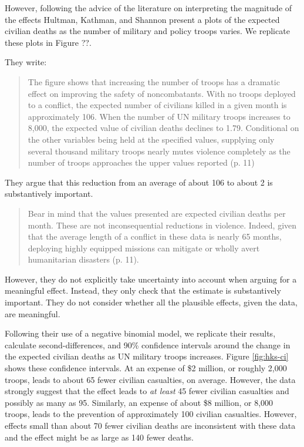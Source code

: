\documentclass[12pt]{article}
\begin{document}
However, following the advice of the literature on interpreting the magnitude of the effects Hultman, Kathman, and Shannon present a plots of the expected civilian deaths as the number of military and policy troops varies. We replicate these plots in Figure ??.

They write:

\begin{quote}
The figure shows that increasing the number of troops has a dramatic effect on improving the safety of noncombatants. With no troops deployed to a conflict, the expected number of civilians killed in a given month is approximately 106. When the number of UN military troops increases to 8,000, the expected value of civilian deaths declines to 1.79. Conditional on the other variables being held at the specified values, supplying only several thousand military troops nearly mutes violence completely as the number of troops approaches the upper values reported (p. 11)
\end{quote}

They argue that this reduction from an average of about 106 to about 2 is substantively important.

\begin{quote}
Bear in mind that the values presented are expected civilian deaths per month. These are not inconsequential reductions in violence. Indeed, given that the average length of a conflict in these data is nearly 65 months, deploying highly equipped missions can mitigate or wholly avert humanitarian disasters (p. 11).
\end{quote}

However, they do not explicitly take uncertainty into account when arguing for a meaningful effect. Instead, they only check that the estimate is substantively important. They do not consider whether all the plausible effects, given the data, are meaningful.

Following their use of a negative binomial model, we replicate their results, calculate second-differences, and 90\% confidence intervals around the change in the expected civilian deaths as UN military troops increases. Figure \ref{fig:hks-ci} shows these confidence intervals. At an expense of \$2 million, or roughly 2,000 troops, leads to about 65 fewer civilian casualties, on average. However, the data strongly suggest that the effect leads to \textit{at least} 45 fewer civilian casualties and possibly as many as 95. Similarly, an expense of about \$8 million, or 8,000 troops, leads to the prevention of approximately 100 civilian casualties. However, effects small than about 70 fewer civilian deaths are inconsistent with these data and the effect might be as large as 140 fewer deaths. 
\end{document}
